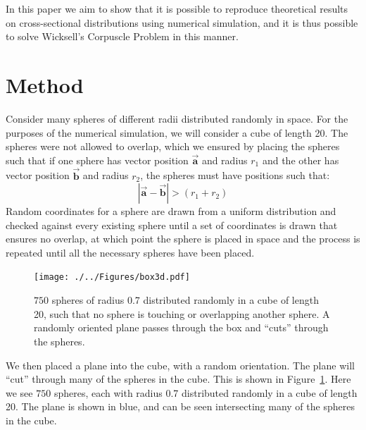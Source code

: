 \documentclass[journal]{IEEEtran}
\begin{document}
In this paper we aim to show that it is possible to reproduce theoretical
results on cross-sectional distributions using numerical simulation, and it is
thus possible to solve Wicksell's Corpuscle Problem in this manner.


\section{Method}

Consider many spheres of different radii distributed randomly in space. For the
purposes of the numerical simulation, we will consider a cube of length 20. The
spheres were not allowed to overlap, which we ensured by placing the spheres such
that if one sphere has vector position $\overrightarrow{\textbf{a}}$ and radius
$r_{1}$ and the other has vector position $\overrightarrow{\textbf{b}}$ and
radius $r_{2}$, the spheres must have positions such that:
\begin{equation*}
|\overrightarrow{\textbf{a}} - \overrightarrow{\textbf{b}}| > (r_{1} + r_{2})
\end{equation*}
Random coordinates for a sphere are drawn from a uniform distribution and
checked against every existing sphere until a set of coordinates is drawn that
ensures no overlap, at which point the sphere is placed in space and the process
is repeated until all the necessary spheres have been placed.

\begin{figure}%
\begin{center}
\texttt{[image: ./../Figures/box3d.pdf]}
\caption{$750$ spheres of radius 0.7 distributed randomly in a cube of length 20,
  such that no sphere is touching or overlapping another sphere. A randomly
  oriented plane passes through the box and ``cuts'' through the
  spheres.}\label{fig:3dplot_plane}
\end{center}
\end{figure}

We then placed a plane into the cube, with a random orientation. The plane will
``cut'' through many of the spheres in the cube. This is shown in
Figure~\ref{fig:3dplot_plane}. Here we see $750$ spheres, each with radius 0.7
distributed randomly in a cube of length 20. The plane is shown in blue, and can
be seen intersecting many of the spheres in the cube.
\end{document}
